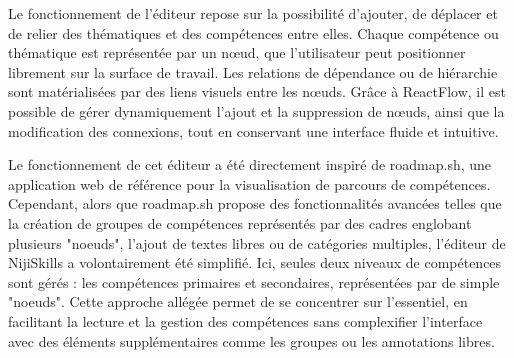 \documentclass[12pt]{article}
\begin{document}
Le fonctionnement de l’éditeur repose sur la possibilité d’ajouter, de déplacer et de relier des thématiques et des compétences entre elles. Chaque compétence ou thématique est représentée par un nœud, que l’utilisateur peut positionner librement sur la surface de travail. Les relations de dépendance ou de hiérarchie sont matérialisées par des liens visuels entre les nœuds. Grâce à ReactFlow, il est possible de gérer dynamiquement l’ajout et la suppression de nœuds, ainsi que la modification des connexions, tout en conservant une interface fluide et intuitive.

Le fonctionnement de cet éditeur a été directement inspiré de roadmap.sh, une application web de référence pour la visualisation de parcours de compétences. Cependant, alors que roadmap.sh propose des fonctionnalités avancées telles que la création de groupes de compétences représentés par des cadres englobant plusieurs "noeuds", l’ajout de textes libres ou de catégories multiples, l’éditeur de NijiSkills a volontairement été simplifié. Ici, seules deux niveaux de compétences sont gérés : les compétences primaires et secondaires, représentées par de simple "noeuds". Cette approche allégée permet de se concentrer sur l’essentiel, en facilitant la lecture et la gestion des compétences sans complexifier l’interface avec des éléments supplémentaires comme les groupes ou les annotations libres.
\end{document}

